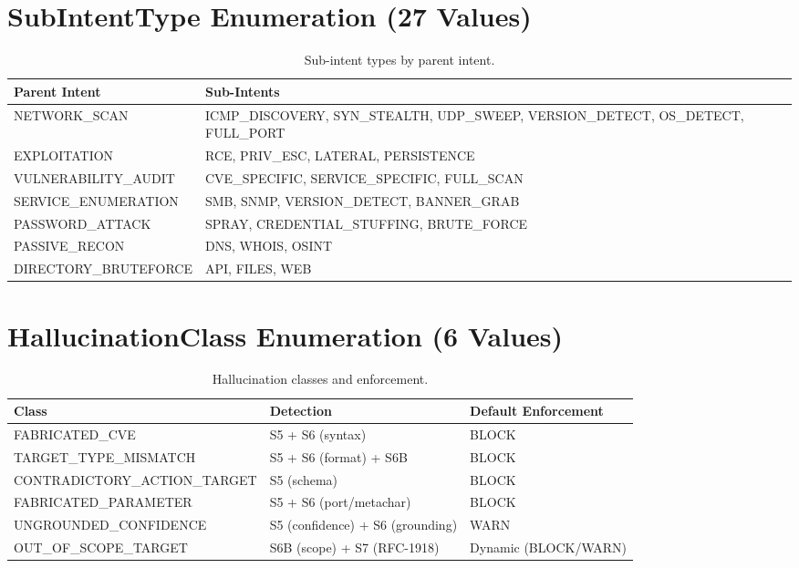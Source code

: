 ﻿\documentclass[10pt,journal,onecolumn]{IEEEtran}
\begin{document}
\section{SubIntentType Enumeration (27 Values)}
\begin{table}[h]
\caption{Sub-intent types by parent intent.}
\label{tab:appC}
\begin{tabularx}{\columnwidth}{>{\ttfamily}l >{\ttfamily}X}
\toprule
\textbf{Parent Intent} & \textbf{Sub-Intents}\\
\midrule
NETWORK\_SCAN & ICMP\_DISCOVERY, SYN\_STEALTH, UDP\_SWEEP, VERSION\_DETECT, OS\_DETECT, FULL\_PORT\\
EXPLOITATION & RCE, PRIV\_ESC, LATERAL, PERSISTENCE\\
VULNERABILITY\_AUDIT & CVE\_SPECIFIC, SERVICE\_SPECIFIC, FULL\_SCAN\\
SERVICE\_ENUMERATION & SMB, SNMP, VERSION\_DETECT, BANNER\_GRAB\\
PASSWORD\_ATTACK & SPRAY, CREDENTIAL\_STUFFING, BRUTE\_FORCE\\
PASSIVE\_RECON & DNS, WHOIS, OSINT\\
DIRECTORY\_BRUTEFORCE & API, FILES, WEB\\
\bottomrule
\end{tabularx}
\end{table}

\section{HallucinationClass Enumeration (6 Values)}
\begin{table}[h]
\caption{Hallucination classes and enforcement.}
\label{tab:appD}
\begin{tabularx}{\columnwidth}{>{\ttfamily}l X X}
\toprule
\textbf{Class} & \textbf{Detection} & \textbf{Default Enforcement}\\
\midrule
FABRICATED\_CVE & S5 + S6 (syntax) & BLOCK\\
TARGET\_TYPE\_MISMATCH & S5 + S6 (format) + S6B & BLOCK\\
CONTRADICTORY\_ACTION\_TARGET & S5 (schema) & BLOCK\\
FABRICATED\_PARAMETER & S5 + S6 (port/metachar) & BLOCK\\
UNGROUNDED\_CONFIDENCE & S5 (confidence) + S6 (grounding) & WARN\\
OUT\_OF\_SCOPE\_TARGET & S6B (scope) + S7 (RFC-1918) & Dynamic (BLOCK/WARN)\\
\bottomrule
\end{tabularx}
\end{table}
\end{document}

